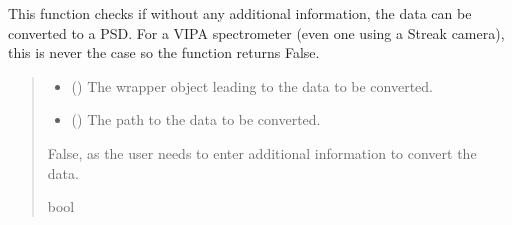 \documentclass[letterpaper,10pt,english]{sphinxmanual}
\begin{document}
\begin{fulllineitems}
\label{\detokenize{source/HDF5_BLS:HDF5_BLS.conversion_PSD.check_conversion_Streak_VIPA}}
\pysigstartsignatures
\pysiglinewithargsret
{}
{\sphinxparamcomma {}}
{}
\pysigstopsignatures
\sphinxAtStartPar
This function checks if without any additional information, the data can be converted to a PSD. For a VIPA spectrometer (even one using a Streak camera), this is never the case so the function returns False.
\begin{quote}\begin{description}
\begin{itemize}
\item {} 
\sphinxAtStartPar
{} ({\hyperref[\detokenize{source/HDF5_BLS:HDF5_BLS.wrapper.Wrapper}]{}}) \textendash{} The wrapper object leading to the data to be converted.

\item {} 
\sphinxAtStartPar
{} () \textendash{} The path to the data to be converted.

\end{itemize}

\sphinxAtStartPar
False, as the user needs to enter additional information to convert the data.

\sphinxAtStartPar
bool

\end{description}\end{quote}

\end{fulllineitems}

\end{document}
